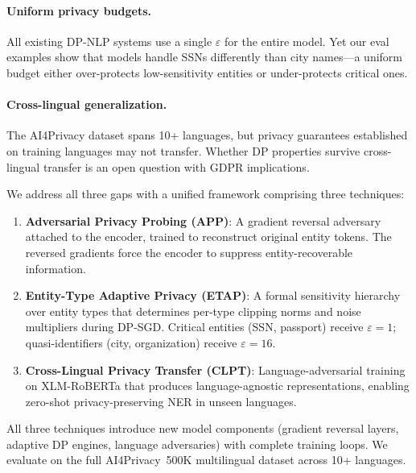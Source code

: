 \documentclass[11pt,a4paper]{article}
\begin{document}
\paragraph{Uniform privacy budgets.}
All existing DP-NLP systems use a single $\varepsilon$ for the entire model.
Yet our eval examples show that models handle SSNs differently than city
names—a uniform budget either over-protects low-sensitivity entities or
under-protects critical ones.

\paragraph{Cross-lingual generalization.}
The AI4Privacy dataset spans 10+ languages, but privacy guarantees established
on training languages may not transfer.  Whether DP properties survive
cross-lingual transfer is an open question with GDPR implications.

We address all three gaps with a unified framework comprising three techniques:

\begin{enumerate}
    \item \textbf{Adversarial Privacy Probing (APP)}: A gradient reversal
    adversary \cite{ganin2016domain} attached to the encoder, trained to
    reconstruct original entity tokens.  The reversed gradients force the
    encoder to suppress entity-recoverable information.

    \item \textbf{Entity-Type Adaptive Privacy (ETAP)}: A formal sensitivity
    hierarchy over entity types that determines per-type clipping norms and
    noise multipliers during DP-SGD.  Critical entities (SSN, passport) receive
    $\varepsilon = 1$; quasi-identifiers (city, organization) receive
    $\varepsilon = 16$.

    \item \textbf{Cross-Lingual Privacy Transfer (CLPT)}: Language-adversarial
    training on XLM-RoBERTa that produces language-agnostic representations,
    enabling zero-shot privacy-preserving NER in unseen languages.
\end{enumerate}

All three techniques introduce new model components (gradient reversal layers,
adaptive DP engines, language adversaries) with complete training loops.
We evaluate on the full AI4Privacy~500K multilingual dataset
\cite{ai4privacy2024} across 10+ languages.

\end{document}
